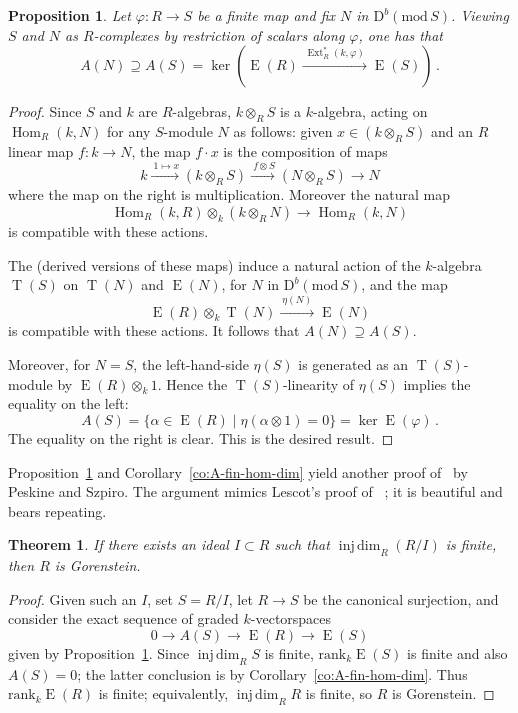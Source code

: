 \documentclass{amsart}
\numberwithin{equation}{section}
\theoremstyle{plain}
\newtheorem{theorem}[equation]{Theorem}
\newtheorem{proposition}[equation]{Proposition}
\theoremstyle{definition}
\theoremstyle{remark}
\newcommand{\dbcat}[1]{\mathrm{D}^b(\mathrm{mod}\,{#1})}
\newcommand{\eee}{\operatorname{E}}
\newcommand{\ext}{\operatorname{Ext}}
\newcommand{\Hom}{\operatorname{Hom}}
\newcommand{\injdim}{\operatorname{inj\,dim}}
\newcommand{\rank}{\mathrm{rank}}
\newcommand{\tee}{\operatorname{T}}
\begin{document}
\begin{proposition}
    \label{pr:A-change-of-rings}
Let $\varphi\colon R\to S$ be a finite map and fix $N$ in $\dbcat S$. Viewing $S$ and $N$ as $R$-complexes by restriction of scalars along $\varphi$, one has that
\[
A(N)\supseteq A(S) = \ker(\eee(R)\xrightarrow{\ \ext_R^*(k,\varphi)\ } \eee(S))\,.
\]
\end{proposition}

\begin{proof}
Since $S$ and $k$ are $R$-algebras, $k\otimes_RS$ is a $k$-algebra, acting on $\Hom_R(k,N)$ for any $S$-module $N$ as follows: given $x\in (k\otimes_RS)$ and an $R$ linear map $f\colon k\to N$, the map $f\cdot x$ is the composition of maps
\[
k\xrightarrow{\ 1\mapsto x} (k\otimes_RS)\xrightarrow{\ f\otimes S} (N\otimes_RS) \longrightarrow N
\]
where the map on the right is multiplication. Moreover the natural map
\[
\Hom_R(k,R)\otimes_k (k\otimes_RN) \longrightarrow \Hom_R(k,N)
\]
is compatible with these actions. 

The (derived versions of these maps) induce a natural action of the $k$-algebra $\tee(S)$ on $\tee(N)$ and $\eee(N)$, for  $N$ in $\dbcat S$,  and the map
 \[
 \eee(R)\otimes_k\tee(N) \xrightarrow{\ \eta(N)\ } \eee(N)
 \]
is compatible with these actions. It follows that $A(N)\supseteq A(S)$. 

Moreover, for $N=S$, the left-hand-side $\eta(S)$ is generated as an $\tee(S)$-module by $\eee(R)\otimes_k 1$. Hence the $\tee(S)$-linearity of $\eta(S)$ implies the equality on the left:
\[
A(S)=\{\alpha\in \eee(R)\mid \eta(\alpha\otimes 1)=0\}=\ker \eee(\varphi)\,.
\]
The equality on the right is clear. This  is the desired result.
 \end{proof}

Proposition~\ref{pr:A-change-of-rings} and  Corollary~\ref{co:A-fin-hom-dim} yield another proof of~\cite[Theorem~5.5]{Peskine/Szpiro:1973} by Peskine and Szpiro. The argument mimics  Lescot's proof of ~\cite[Theorem~1.9]{Lescot:1986}; it is beautiful and bears repeating.

\begin{theorem}
\label{th:ps}
If there exists an ideal $I\subset R$ such that $\injdim_R(R/I)$ is finite, then $R$ is Gorenstein.
\end{theorem}

\begin{proof}
Given such an $I$, set $S=R/I$, let $R\to S$ be the canonical surjection, and consider the exact sequence of graded $k$-vectorspaces
\[
0\longrightarrow A(S)\longrightarrow \eee(R)\longrightarrow \eee(S)
\]
given by Proposition~\ref{pr:A-change-of-rings}. Since $\injdim_RS$ is finite, $\rank_k\eee(S)$ is finite and also 
$A(S)=0$; the latter conclusion is by Corollary~\ref{co:A-fin-hom-dim}. Thus $\rank_k\eee(R)$ is finite; equivalently, $\injdim_RR$ is finite, so $R$ is Gorenstein.
\end{proof}
\end{document}
